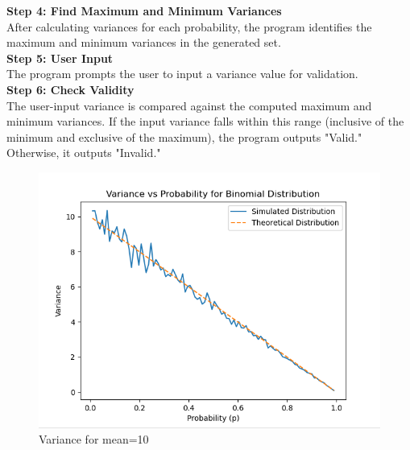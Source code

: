\documentclass[journal,12pt,twocolumn]{IEEEtran}
\begin{document}
\textbf{Step 4: Find Maximum and Minimum Variances}\\
After calculating variances for each probability, the program identifies the maximum and minimum variances in the generated set.\\
\textbf{Step 5: User Input}\\
The program prompts the user to input a variance value for validation.
\\
\textbf{Step 6: Check Validity}\\
The user-input variance is compared against the computed maximum and minimum variances. If the input variance falls within this range (inclusive of the minimum and exclusive of the maximum), the program outputs "Valid." Otherwise, it outputs "Invalid."
\begin{figure}[ht!]
    \centering
    \includegraphics[width=\columnwidth]{./codes/ss10.png}
    \caption{Variance for mean=10}
    \label{fig:ss10}
\end{figure}

	

	
\end{document}
